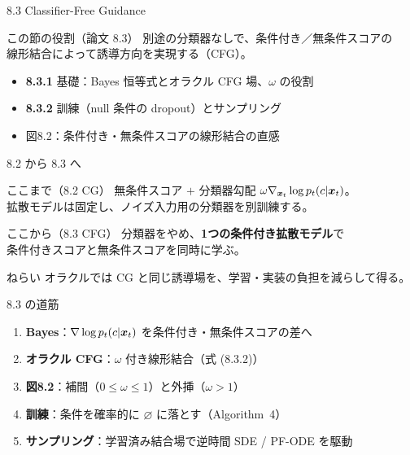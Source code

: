 

\asmain
\begin{frame}{8.3 Classifier-Free Guidance}
    \begin{block}{この節の役割（論文 8.3）}
        別途の分類器なしで、条件付き／無条件スコアの\\
        線形結合によって誘導方向を実現する（CFG）。
    \end{block}
    \begin{itemize}
        \item \textbf{8.3.1} 基礎：Bayes 恒等式とオラクル CFG 場、$\omega$ の役割
        \item \textbf{8.3.2} 訓練（null 条件の dropout）とサンプリング
        \item 図8.2：条件付き・無条件スコアの線形結合の直感
    \end{itemize}
\end{frame}
\asmain
\begin{frame}{8.2 から 8.3 へ}
    \begin{block}{ここまで（8.2 CG）}
        無条件スコア $+$ 分類器勾配 $\omega\nabla_{\bm{x}_t}\log p_t(c|\bm{x}_t)$。\\
        拡散モデルは固定し、ノイズ入力用の分類器を別訓練する。
    \end{block}
    \begin{block}{ここから（8.3 CFG）}
        分類器をやめ、\textbf{1つの条件付き拡散モデル}で\\
        条件付きスコアと無条件スコアを同時に学ぶ。
    \end{block}
    \begin{exampleblock}{ねらい}
        オラクルでは CG と同じ誘導場を、学習・実装の負担を減らして得る。
    \end{exampleblock}
\end{frame}
\asmain
\begin{frame}{8.3 の道筋}
    \begin{enumerate}
        \item \textbf{Bayes}：$\nabla\log p_t(c|\bm{x}_t)$ を条件付き・無条件スコアの差へ
        \item \textbf{オラクル CFG}：$\omega$ 付き線形結合（式 (8.3.2)）
        \item \textbf{図8.2}：補間（$0\le\omega\le 1$）と外挿（$\omega>1$）
        \item \textbf{訓練}：条件を確率的に $\varnothing$ に落とす（Algorithm~4）
        \item \textbf{サンプリング}：学習済み結合場で逆時間 SDE / PF-ODE を駆動
    \end{enumerate}
\end{frame}
